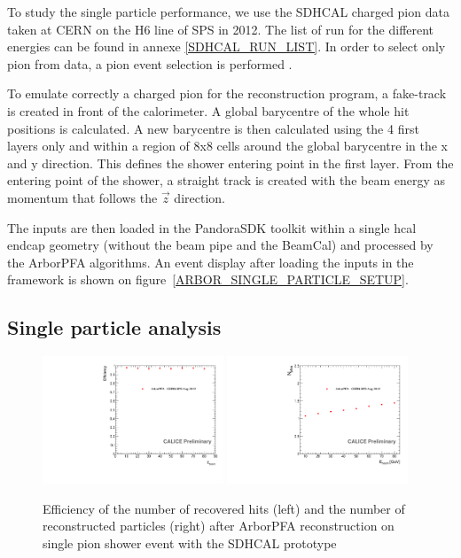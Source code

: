 \documentclass[cits]{JINST}
\begin{document}
To study the single particle performance, we use the SDHCAL charged pion data taken at CERN on the H6 line of SPS in 2012. The list of run for the different energies can be found in annexe \ref{SDHCAL_RUN_LIST}. In order to select only pion from data, a pion event selection is performed \cite{sdhcal-paper}.

To emulate correctly a charged pion for the reconstruction program, a fake-track is created in front of the calorimeter. A global barycentre of the whole hit positions is calculated. A new barycentre is then calculated using the 4 first layers only and within a region of 8x8 cells around the global barycentre in the x and y direction. This defines the shower entering point in the first layer. From the entering point of the shower, a straight track is created with the beam energy as momentum that follows the $\vec{z}$ direction.

The inputs are then loaded in the PandoraSDK toolkit within a single hcal endcap geometry (without the beam pipe and the BeamCal) and processed by the ArborPFA algorithms. An event display after loading the inputs in the framework is shown on figure~\ref{ARBOR_SINGLE_PARTICLE_SETUP}.

\subsection{Single particle analysis}

\begin{figure}[!h]
  \begin{center}
    \includegraphics[width=0.48\textwidth]{plots/SingleParticle_Efficiency.pdf}
    \includegraphics[width=0.48\textwidth]{plots/SingleParticle_NPfos.pdf} \\
  \end{center}
  \caption{\label{ARBOR_SINGLE_PARTICLE_EFFICIENCY_AND_NPFOS} Efficiency of the number of recovered hits (left) and the number of reconstructed particles (right) after ArborPFA reconstruction on single pion shower event with the SDHCAL prototype}
\end{figure}
\end{document}
